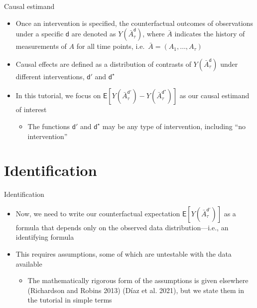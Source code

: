 \documentclass[
  10pt,
  ignorenonframetext,
]{beamer}
\providecommand{\tightlist}{%
  \setlength{\itemsep}{0pt}\setlength{\parskip}{0pt}}\usepackage{longtable,booktabs,array}
\begin{document}
\begin{frame}{Causal estimand}
\protect\hypertarget{causal-estimand-1}{}
\begin{itemize}
\item
  Once an intervention is specified, the counterfactual outcomes of
  observations under a specific \(\mathsf{d}\) are denoted as
  \(Y(\bar{A}_\tau^\mathsf{d})\), where \(\bar{A}\) indicates the
  history of measurements of \(A\) for all time points,
  i.e.~\(\bar A = (A_1, \ldots, A_\tau)\)
\item
  Causal effects are defined as a distribution of contrasts of
  \(Y(\bar{A}_\tau^\mathsf{d})\) under different interventions,
  \(\mathsf{d}'\) and \(\mathsf{d}^\star\)
\item
  In this tutorial, we focus on
  \(\mathsf{E}[Y(\bar{A}_\tau^{\mathsf{d}'}) - Y(\bar{A}_\tau^{\mathsf{d}^ {\star}})]\)
  as our causal estimand of interest

  \begin{itemize}
  \tightlist
  \item
    The functions \(\mathsf{d}'\) and \(\mathsf{d}^\star\) may be any
    type of intervention, including ``no intervention''
  \end{itemize}
\end{itemize}
\end{frame}

\hypertarget{identification}{%
\section{Identification}\label{identification}}

\begin{frame}{Identification}
\protect\hypertarget{identification-1}{}
\begin{itemize}
\item
  Now, we need to write our counterfactual expectation
  \(\mathsf{E}[Y(\bar{A}_\tau^{\mathsf{d}'})]\) as a formula that
  depends only on the observed data distribution---i.e., an identifying
  formula
\item
  This requires assumptions, some of which are untestable with the data
  available

  \begin{itemize}
  \tightlist
  \item
    The mathematically rigorous form of the assumptions is given
    elsewhere (Richardson and Robins 2013) (Díaz et al. 2021), but we
    state them in the tutorial in simple terms
  \end{itemize}
\end{itemize}
\end{frame}
\end{document}
